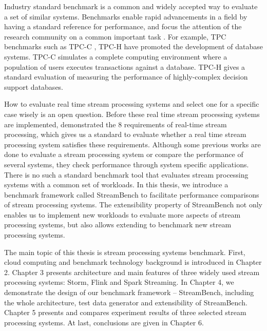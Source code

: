 Industry standard benchmark is a common and widely accepted way to evaluate a set of similar systems. Benchmarks enable rapid advancements in a field by having a standard reference for performance, and focus the attention of the research community on a common important task \cite{patterson2012better}. For example, TPC benchmarks such as TPC-C \cite{TPC-C}, TPC-H \cite{TPC-H} have promoted the development of database systems. TPC-C simulates a complete computing environment where a population of users executes transactions against a database. TPC-H gives a standard evaluation of measuring the performance of highly-complex decision support databases.

How to evaluate real time stream processing systems and select one for a specific case wisely is an open question.  Before these real time stream processing systems are implemented, \citeauthor{8requirements} demonstrated the 8 requirements\cite{8requirements} of real-time stream processing, which gives us a standard to evaluate whether a real time stream processing system satisfies these requirements.
Although some previous works \cite{cordovaanalysis, xinhstechblog, samza-benchmark, manoj-sotrm-vs-spark,flink-latency} are done to evaluate a stream processing system or compare the performance of several systems, they check performance through system specific applications. There is no such a standard benchmark tool that evaluates stream processing systems with a common set of workloads. In this thesis, we introduce a benchmark framework called StreamBench to facilitate performance comparisons of stream processing systems. The extensibility property of StreamBench not only enables us to implement new workloads to evaluate more aspects of stream processing systems, but also allows extending to benchmark new stream processing systems.

The main topic of this thesis is stream processing systems benchmark. First, cloud computing and benchmark technology background is introduced in Chapter 2. Chapter 3 presents architecture and main features of three widely used stream processing systems: Storm, Flink and Spark Streaming. In Chapter 4, we demonstrate the design of our benchmark framework -- StreamBench, including the whole architecture, test data generator and extensibility of StreamBench. Chapter 5 presents and compares experiment results of three selected stream processing systems. At last, conclusions are given in Chapter 6.

\clearpage

